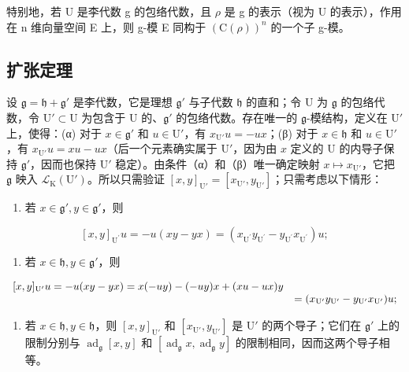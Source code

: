 特别地，若 U 是李代数 g 的包络代数，且 \(\rho\) 是 g 的表示（视为 U 的表示），作用在 n 维向量空间 E 上，则 g-模 E 同构于 \((\mathrm{C}(\rho))^{n}\) 的一个子 g-模。

\subsection{扩张定理}

设 \(\mathfrak{g} = \mathfrak{h} + \mathfrak{g}'\) 是李代数，它是理想 \(\mathfrak{g}'\) 与子代数 \(\mathfrak{h}\) 的直和；令 U 为 \(\mathfrak{g}\) 的包络代数，令 \(\mathrm{U}' \subset \mathrm{U}\) 为包含于 U 的、\(\mathfrak{g}'\) 的包络代数。存在唯一的 \(\mathfrak{g}\)-模结构，定义在 \(\mathrm{U}'\) 上，使得：(α) 对于 \(x \in \mathfrak{g}'\) 和 \(u \in \mathrm{U}'\)，有 \(x_{\mathrm{U}'}u = -ux\)；(β) 对于 \(x \in \mathfrak{h}\) 和 \(u \in \mathrm{U}'\)，有 \(x_{\mathrm{U}'}u = xu - ux\)（后一个元素确实属于 \(\mathrm{U}'\)，因为由 \(x\) 定义的 U 的内导子保持 \(\mathfrak{g}'\)，因而也保持 \(\mathrm{U}'\) 稳定）。由条件（α）和（β）唯一确定映射 \(x \mapsto x_{\mathrm{U}'}\)，它把 \(\mathfrak{g}\) 映入 \(\mathcal{L}_{\mathrm{K}}(\mathrm{U}')\)。所以只需验证 \([x, y]_{\mathrm{U}'} = [x_{\mathrm{U}'}, y_{\mathrm{U}'}]\)；只需考虑以下情形：

\begin{enumerate}
\def\labelenumi{(\arabic{enumi})}
\tightlist
\item
  若 \(x \in \mathfrak{g}', y \in \mathfrak{g}'\)，则
\end{enumerate}

\[
[ x, y ] _ {\mathrm{U} ^ {\prime}} u = - u (x y - y x) = \left(x _ {\mathrm{U} ^ {\prime}} y _ {\mathrm{U} ^ {\prime}} - y _ {\mathrm{U} ^ {\prime}} x _ {\mathrm{U} ^ {\prime}}\right) u;
\]

\begin{enumerate}
\def\labelenumi{(\arabic{enumi})}
\setcounter{enumi}{1}
\tightlist
\item
  若 \(x \in \mathfrak{h}, y \in \mathfrak{g}'\)，则
\end{enumerate}

\[
\begin{array}{r l} {[ x, y ] _ {\mathrm{U}'} u = - u (x y - y x) = x (- u y) - (- u y) x + (x u - u x) y} \\ & {= (x _ {\mathrm{U}'} y _ {\mathrm{U}'} - y _ {\mathrm{U}'} x _ {\mathrm{U}'}) u;} \end{array}
\]

\begin{enumerate}
\def\labelenumi{(\arabic{enumi})}
\setcounter{enumi}{2}
\tightlist
\item
  若 \(x \in \mathfrak{h}, y \in \mathfrak{h}\)，则 \([x, y]_{\mathrm{U}'}\) 和 \([x_{\mathrm{U}'}, y_{\mathrm{U}'}]\) 是 \(\mathrm{U}'\) 的两个导子；它们在 \(\mathfrak{g}'\) 上的限制分别与 \(\operatorname{ad}_{\mathfrak{g}}[x, y]\) 和 \([\operatorname{ad}_{\mathfrak{g}}x, \operatorname{ad}_{\mathfrak{g}}y]\) 的限制相同，因而这两个导子相等。
\end{enumerate}


